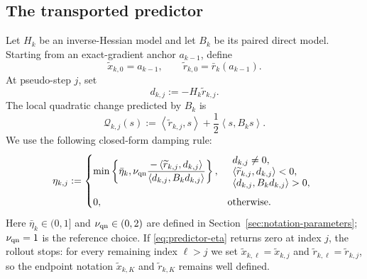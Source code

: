 \documentclass[10pt,leqno]{amsart}
\numberwithin{equation}{section}
\numberwithin{algorithm}{section}
\theoremstyle{remark}
\newcommand{\ip}[2]{\left\langle #1,#2 \right\rangle}
\begin{document}
\subsection{The transported predictor}
\label{sec:transported-predictor}

Let $H_k$ be an inverse-Hessian model and let $B_k$ be its paired direct model.  Starting from an exact-gradient anchor $a_{k-1}$, define
\begin{equation}
\label{eq:model-rollout-initial}
    \widetilde x_{k,0}=a_{k-1},
    \qquad
    \widetilde r_{k,0}=\bar r_k(a_{k-1}).
\end{equation}
At pseudo-step $j$, set
\begin{equation}
\label{eq:model-rollout-direction}
    d_{k,j}:=-H_k\widetilde r_{k,j}.
\end{equation}
The local quadratic change predicted by $B_k$ is
\begin{equation}
\label{eq:pseudo-quadratic-model}
    \mathcal Q_{k,j}(s)
    :=\ip{\widetilde r_{k,j}}{s}
      +\frac12\ip{s}{B_ks}.
\end{equation}
We use the following closed-form damping rule:
\begin{equation}
\label{eq:predictor-eta}
\eta_{k,j}:=
\begin{cases}
\displaystyle
\min\left\{\bar\eta_k,
\nu_{\rm qn}
\frac{-\ip{\widetilde r_{k,j}}{d_{k,j}}}
     {\ip{d_{k,j}}{B_kd_{k,j}}}
\right\},
&\begin{array}{l}
 d_{k,j}\ne0,\\[-1mm]
 \ip{\widetilde r_{k,j}}{d_{k,j}}<0,\\[-1mm]
 \ip{d_{k,j}}{B_kd_{k,j}}>0,
\end{array}\\[6mm]
0, &\text{otherwise}.
\end{cases}
\end{equation}
Here $\bar\eta_k\in(0,1]$ and $\nu_{\rm qn}\in(0,2)$ are defined in Section~\ref{sec:notation-parameters}; $\nu_{\rm qn}=1$ is the reference choice.  If \eqref{eq:predictor-eta} returns zero at index $j$, the rollout stops: for every remaining index $\ell>j$ we set $\widetilde x_{k,\ell}=\widetilde x_{k,j}$ and $\widetilde r_{k,\ell}=\widetilde r_{k,j}$, so the endpoint notation $\widetilde x_{k,K}$ and $\widetilde r_{k,K}$ remains well defined.
\end{document}
